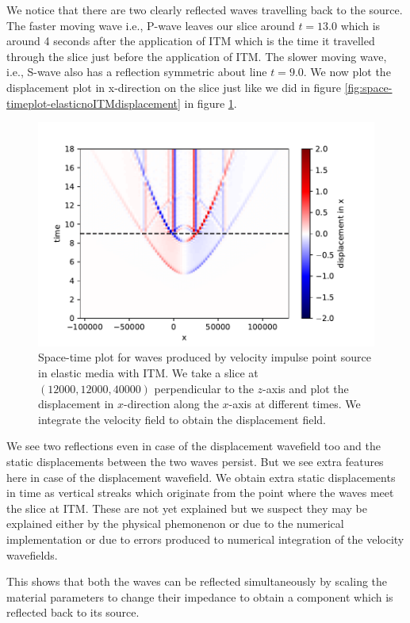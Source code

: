 We notice that there are two clearly reflected waves travelling back to the source. The faster moving wave i.e., P-wave leaves our slice around 
$t=13.0$ which is around 4 seconds after the application of \ac{ITM} which is the time it travelled through the slice just before the application of \ac{ITM}. 
The slower moving wave, i.e., S-wave also has a reflection symmetric about line $t=9.0$. We now plot the displacement plot in x-direction on the 
slice just like we did in figure \ref{fig:space-timeplot-elasticnoITMdisplacement} in figure \ref{fig:space-timeplot-elasticITMdisplacement}.

\begin{figure}[htpb]
    \centering
    \includegraphics[width=0.75\linewidth]{figures/Elastic-tworeflections-displacement.pdf}
    \caption{Space-time plot for waves produced by velocity impulse point source in elastic media with \ac{ITM}. We take a slice at $\left(12000,12000,40000\right)$ perpendicular to the $z$-axis
    and plot the displacement in $x$-direction along the $x$-axis at different times. We integrate the velocity field to obtain the displacement field.}
    \label{fig:space-timeplot-elasticITMdisplacement}
\end{figure}

We see two reflections even in case of the displacement wavefield too and the static displacements between the two waves persist. But we see extra features here in case of the displacement wavefield. We obtain extra static displacements in time as vertical streaks which originate from the point where the waves meet the slice at \ac{ITM}. These are not yet explained but we suspect they may be explained either by the physical phemonenon or due to the numerical implementation or due to errors produced to numerical integration of the velocity wavefields.
\par This shows that both the waves can be reflected simultaneously by scaling the material parameters to change their impedance to obtain a component which 
is reflected back to its source.

